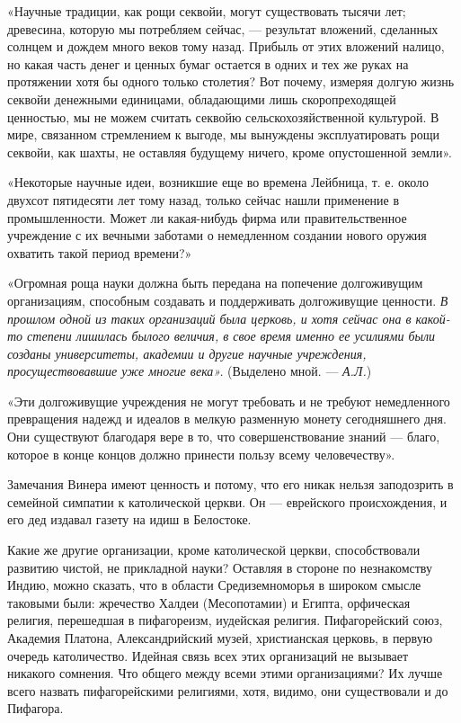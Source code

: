 «Научные традиции, как рощи секвойи, могут существовать тысячи лет;
древесина, которую мы потребляем сейчас, --- результат вложений, сделанных
солнцем и дождем много веков тому назад. Прибыль от этих вложений налицо, но
какая часть денег и ценных бумаг остается в одних и тех же руках на
протяжении хотя бы одного только столетия? Вот почему, измеряя долгую жизнь
секвойи денежными единицами, обладающими лишь скоропреходящей ценностью, мы не
можем считать секвойю сельскохозяйственной культурой. В мире, связанном
стремлением к выгоде, мы вынуждены эксплуатировать рощи секвойи, как шахты, не
оставляя будущему ничего, кроме опустошенной земли».

«Некоторые научные идеи, возникшие еще во времена Лейбница, т. е. около
двухсот пятидесяти лет тому назад, только сейчас нашли применение в
промышленности. Может ли какая-нибудь фирма или правительственное
учреждение с их вечными заботами о немедленном создании нового оружия
охватить такой период времени?»

«Огромная роща науки должна быть передана на попечение долгоживущим
организациям, способным создавать и поддерживать долгоживущие ценности. \emph{В
прошлом одной из таких организаций была церковь, и хотя сейчас она в какой-то
степени лишилась былого величия, в свое время именно ее усилиями были
созданы университеты, академии и другие научные учреждения,
просуществовавшие уже многие века».} (Выделено мной. --- \emph{А.Л.})

«Эти долгоживущие учреждения не могут требовать и не требуют немедленного
превращения надежд и идеалов в мелкую разменную монету сегодняшнего дня. Они
существуют благодаря вере в то, что совершенствование знаний --- благо,
которое в конце концов должно принести пользу всему человечеству».

Замечания Винера имеют ценность и потому, что его никак нельзя заподозрить в
семейной симпатии к католической церкви. Он --- еврейского происхождения, и его
дед издавал газету на идиш в Белостоке.

Какие же другие организации, кроме католической церкви, способствовали
развитию чистой, не прикладной науки? Оставляя в стороне по незнакомству
Индию, можно сказать, что в области Средиземноморья в широком смысле
таковыми были: жречество Халдеи (Месопотамии) и Египта, орфическая религия,
перешедшая в пифагореизм, иудейская религия. Пифагорейский союз, Академия
Платона, Александрийский музей, христианская церковь, в первую очередь
католичество. Идейная связь всех этих организаций не вызывает никакого
сомнения. Что общего между всеми этими организациями? Их лучше всего
назвать пифагорейскими религиями, хотя, видимо, они существовали и до
Пифагора.

